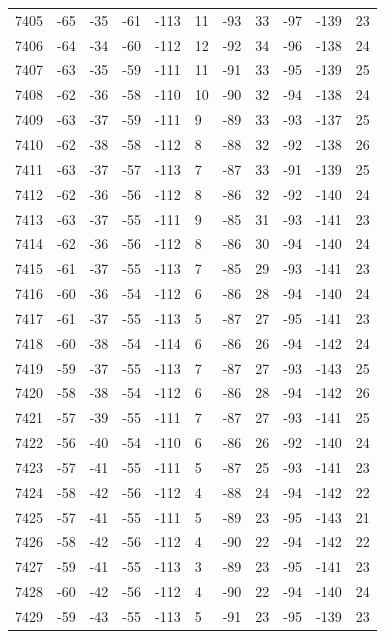 \begin{table}[H]
\begin{tabular}{lllllllllll}
7405 & -65 & -35 & -61 & -113 & 11 & -93 & 33 & -97 & -139 & 23 \\
7406 & -64 & -34 & -60 & -112 & 12 & -92 & 34 & -96 & -138 & 24 \\
7407 & -63 & -35 & -59 & -111 & 11 & -91 & 33 & -95 & -139 & 25 \\
7408 & -62 & -36 & -58 & -110 & 10 & -90 & 32 & -94 & -138 & 24 \\
7409 & -63 & -37 & -59 & -111 & 9 & -89 & 33 & -93 & -137 & 25 \\
7410 & -62 & -38 & -58 & -112 & 8 & -88 & 32 & -92 & -138 & 26 \\
7411 & -63 & -37 & -57 & -113 & 7 & -87 & 33 & -91 & -139 & 25 \\
7412 & -62 & -36 & -56 & -112 & 8 & -86 & 32 & -92 & -140 & 24 \\
7413 & -63 & -37 & -55 & -111 & 9 & -85 & 31 & -93 & -141 & 23 \\
7414 & -62 & -36 & -56 & -112 & 8 & -86 & 30 & -94 & -140 & 24 \\
7415 & -61 & -37 & -55 & -113 & 7 & -85 & 29 & -93 & -141 & 23 \\
7416 & -60 & -36 & -54 & -112 & 6 & -86 & 28 & -94 & -140 & 24 \\
7417 & -61 & -37 & -55 & -113 & 5 & -87 & 27 & -95 & -141 & 23 \\
7418 & -60 & -38 & -54 & -114 & 6 & -86 & 26 & -94 & -142 & 24 \\
7419 & -59 & -37 & -55 & -113 & 7 & -87 & 27 & -93 & -143 & 25 \\
7420 & -58 & -38 & -54 & -112 & 6 & -86 & 28 & -94 & -142 & 26 \\
7421 & -57 & -39 & -55 & -111 & 7 & -87 & 27 & -93 & -141 & 25 \\
7422 & -56 & -40 & -54 & -110 & 6 & -86 & 26 & -92 & -140 & 24 \\
7423 & -57 & -41 & -55 & -111 & 5 & -87 & 25 & -93 & -141 & 23 \\
7424 & -58 & -42 & -56 & -112 & 4 & -88 & 24 & -94 & -142 & 22 \\
7425 & -57 & -41 & -55 & -111 & 5 & -89 & 23 & -95 & -143 & 21 \\
7426 & -58 & -42 & -56 & -112 & 4 & -90 & 22 & -94 & -142 & 22 \\
7427 & -59 & -41 & -55 & -113 & 3 & -89 & 23 & -95 & -141 & 23 \\
7428 & -60 & -42 & -56 & -112 & 4 & -90 & 22 & -94 & -140 & 24 \\
7429 & -59 & -43 & -55 & -113 & 5 & -91 & 23 & -95 & -139 & 23 \\

\end{tabular}
\end{table}
